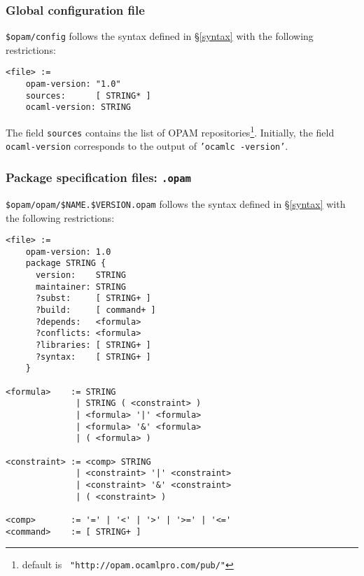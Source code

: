 \documentclass[a4paper,11pt]{article}
\begin{document}
\subsubsection{Global configuration file}
\label{config}

\verb+$opam/config+ follows the syntax defined in \S\ref{syntax} with
the following restrictions:

{\small
\begin{Verbatim}[frame=single]
<file> :=
    opam-version: "1.0"
    sources:      [ STRING* ]
    ocaml-version: STRING
\end{Verbatim}
}

The field {\tt sources} contains the list of OPAM
repositories\footnote{default is {\tt
    "http://opam.ocamlpro.com/pub/"}}. Initially, the field {\tt
  ocaml-version} corresponds to the output of {\tt 'ocamlc -version'}.

\subsubsection{Package specification files: {\tt .opam}}
\label{dotopam}

\verb+$opam/opam/$NAME.$VERSION.opam+ follows the syntax defined in
\S\ref{syntax} with the following restrictions:

{\small
\begin{Verbatim}[frame=single]
<file> :=
    opam-version: 1.0
    package STRING {
      version:    STRING
      maintainer: STRING
      ?subst:     [ STRING+ ]
      ?build:     [ command+ ]
      ?depends:   <formula>
      ?conflicts: <formula>
      ?libraries: [ STRING+ ]
      ?syntax:    [ STRING+ ]
    }

<formula>    := STRING
              | STRING ( <constraint> )
              | <formula> '|' <formula>
              | <formula> '&' <formula>
              | ( <formula> )

<constraint> := <comp> STRING
              | <constraint> '|' <constraint>
              | <constraint> '&' <constraint>
              | ( <constraint> )

<comp>       := '=' | '<' | '>' | '>=' | '<='
<command>    := [ STRING+ ]
\end{Verbatim}
}
\end{document}
